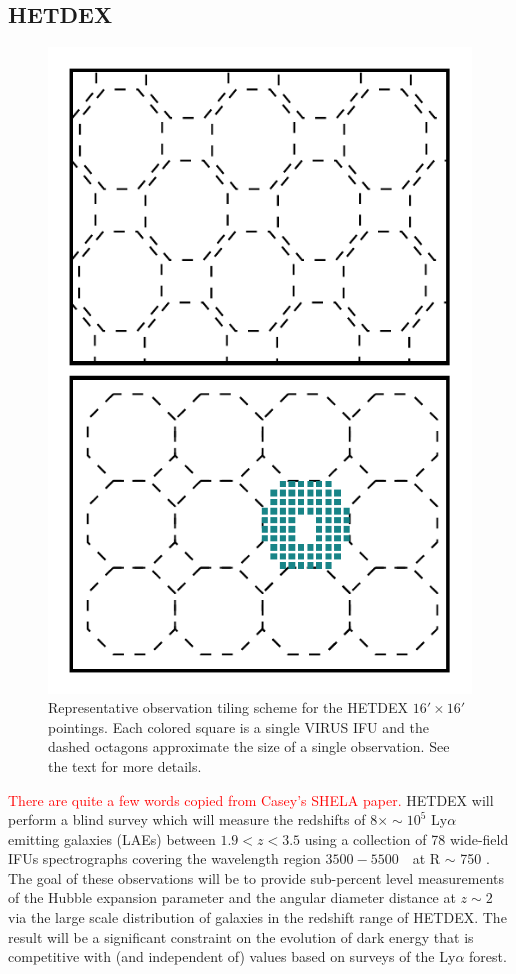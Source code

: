 \documentclass[fleqn,usenatbib]{mnras}
\newcommand{\editorial}[1]{\textcolor{red}{#1}}
\begin{document}
\subsection{HETDEX}\label{sec: hetdex}
\begin{figure} 
	\includegraphics[width=\columnwidth]{figures/pointings.pdf} 
	\caption{Representative observation tiling scheme for the HETDEX $16' \times 16'$ pointings. Each colored square is a single VIRUS IFU and the dashed octagons approximate the size of a single observation. See the text for more details.} \label{fig: ifu layout} 
\end{figure}

\editorial{There are quite a few words copied from Casey's SHELA paper.}
HETDEX will perform a blind survey which will measure the redshifts of $8 \times \sim 10^5$ Ly$\alpha$ emitting galaxies (LAEs) between $1.9 < z < 3.5$ using a collection of 78 wide-field IFUs spectrographs covering the wavelength region $3500 - 5500$~\AAA\ at R $\sim$ 750 \citep{Hill2008}. The goal of these observations will be to provide sub-percent level measurements of the Hubble expansion parameter and the angular diameter distance at $z \sim 2$ via the large scale distribution of galaxies in the redshift range of HETDEX. The result will be a significant constraint on the evolution of dark energy that is competitive with (and independent of) values based on surveys of the Ly$\alpha$ forest.
\end{document}
